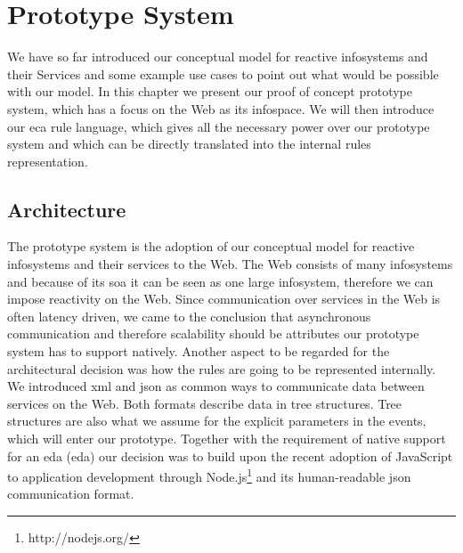 

\chapter{Prototype System}
We have so far introduced our conceptual model for reactive \textrm{\glspl{infosystem}} and their Services and some example use cases to point out what would be possible with our model.
In this chapter we present our proof of concept prototype system, which has a focus on the Web as its \textrm{\gls{infospace}}.
We will then introduce our \textrm{\acrshort{eca}} rule language, which gives all the necessary power over our prototype system and which can be directly translated into the internal rules representation.



\section{Architecture}
The prototype system is the adoption of our conceptual model for reactive \textrm{\glspl{infosystem}} and their services to the Web.
The Web consists of many \textrm{\glspl{infosystem}} and because of its \textrm{\acrlong{soa}} it can be seen as one large \textrm{\gls{infosystem}}, therefore we can impose reactivity on the Web.
Since communication over services in the Web is often latency driven, we came to the conclusion that asynchronous communication and therefore scalability should be attributes our prototype system has to support natively.
Another aspect to be regarded for the architectural decision was how the rules are going to be represented internally.
We introduced \textrm{\acrshort{xml}} and \textrm{\acrshort{json}} as common ways to communicate data between services on the Web.
Both formats describe data in tree structures.
Tree structures are also what we assume for the explicit parameters in the events, which will enter our prototype.
Together with the requirement of native support for an \textrm{\acrlong{eda} (\acrshort{eda})} our decision was to build upon the recent adoption of \textrm{JavaScript} to application development through \textrm{Node.js}\footnote{http://nodejs.org/} and its human-readable \textrm{\acrshort{json}} communication format.

